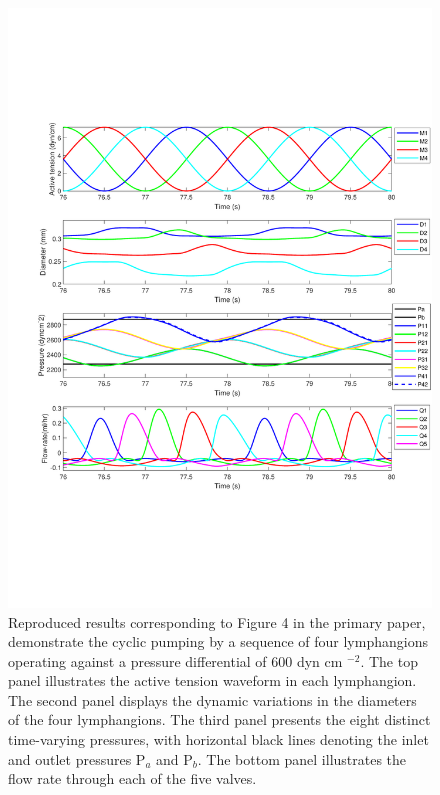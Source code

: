 \documentclass[fleqn,10pt]{physiome}
\begin{document}
\begin{figure}[p]\centering
\includegraphics[trim=1.25cm 5.0cm 0.0cm 0.0cm, clip=true, totalheight=0.75\textheight, ]{figure_2_reproduced.pdf}
\caption{Reproduced results corresponding to Figure 4 in the primary paper, demonstrate the cyclic pumping by a sequence of four lymphangions operating against a pressure differential of 600 dyn cm $^{-2}$. The top panel illustrates the active tension waveform in each lymphangion. The second panel displays the dynamic variations in the diameters of the four lymphangions. The third panel presents the eight distinct time-varying pressures, with horizontal black lines denoting the inlet and outlet pressures P$_{a}$ and P$_{b}$. The bottom panel illustrates the flow rate through each of the five valves.}
\label{fig:reproduced_1}
\end{figure}
\end{document}
